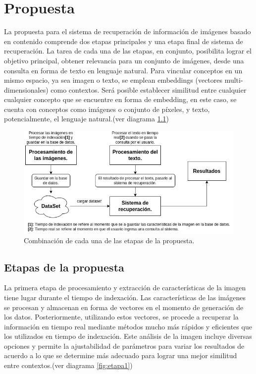 \chapter{Propuesta}\label{chapter:proposal}
La propuesta para el sistema de recuperación de información de imágenes basado en contenido comprende dos etapas principales y una etapa final de sistema de recuperaci\'on. La tarea de cada una de las etapas, en conjunto, posibilita lograr el objetivo principal, obtener relevancia para un conjunto de im\'agenes, desde una consulta en forma de texto en lenguaje natural. Para vincular conceptos en un mismo espacio, ya sea imagen o texto, se emplean embeddings (vectores multi-dimensionales) como contextos. Ser\'a posible establecer similitud entre cualquier cualquier concepto que se encuentre en forma de embedding, en este caso, se cuenta con conceptos como im\'agenes o conjunto de p\'ixeles, y texto, potencialmente, el lenguaje natural.(ver diagrama \ref{fig:etapas})

\begin{figure}[H]
    \centering
\includegraphics[height=0.25\textheight]{Graphics/Todas.drawio.png}
    \caption{Combinaci\'on de cada una de las etapas de la propuesta.}
    \label{fig:etapas}
\end{figure}    

\section{Etapas de la propuesta}

La primera etapa de procesamiento y extracción de características de la imagen tiene lugar durante el tiempo de indexación. Las características de las imágenes se procesan y almacenan en forma de vectores en el momento de generación de los datos. Posteriormente, utilizando estos vectores, se procede a recuperar la información en tiempo real mediante métodos mucho más rápidos y eficientes que los utilizados en tiempo de indexación. Este análisis de la imagen incluye diversas opciones y permite la ajustabilidad de parámetros para variar los resultados de acuerdo a lo que se determine más adecuado para lograr una mejor similitud entre contextos.(ver diagrama \ref{fig:etapa1})

